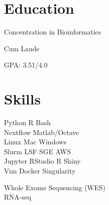 
\begin{minipage}[t]{0.33\textwidth} %

\section{Education} 

\vspace{\topsep} %
\vspace{1pt}
\begin{tightitemize}
\item Concentration in Bioinformatics
\item Cum Laude
\item GPA: 3.51/4.0
\end{tightitemize}
\vspace{3pt}

\section{Skills}

Python \textbullet{} R \textbullet{} Bash \\ 
Nextflow \textbullet{} Matlab/Octave \\
Linux \textbullet{} Mac \textbullet{} Windows\\
Slurm \textbullet{} LSF \textbullet{} SGE \textbullet{} AWS \\

Jupyter \textbullet{} RStudio \textbullet{} R Shiny\\
Vim \textbullet{} Docker \textbullet{} Singularity \\
\sectionspace %

Whole Exome Sequencing (WES) \\
RNA-seq \\


\end{minipage}
